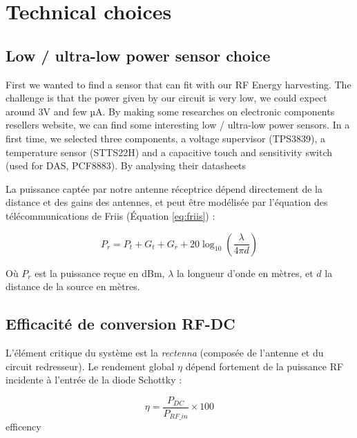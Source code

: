 \section{Technical choices}
\label{sec:task3}

\subsection{Low / ultra-low power sensor choice}
    First we wanted to find a sensor that can fit with our RF Energy harvesting. 
The challenge is that the power given by our circuit is very low, we could expect around 3V
and few µA. By making some researches on electronic components resellers website, we can find 
some interesting low / ultra-low power sensors. In a first time, we selected three components, a voltage supervisor (TPS3839), 
a temperature sensor (STTS22H) and a capacitive touch and sensitivity switch (used for DAS, PCF8883).
By analysing their datasheets   

La puissance captée par notre antenne réceptrice dépend directement de la distance et des gains des antennes, et peut être modélisée par l'équation des télécommunications de Friis (Équation \ref{eq:friis}) :

\begin{equation} \label{eq:friis}
    P_{r} = P_{t} + G_{t} + G_{r} + 20\log_{10}\left(\frac{\lambda}{4\pi d}\right)
\end{equation}

Où $P_r$ est la puissance reçue en dBm, $\lambda$ la longueur d'onde en mètres, et $d$ la distance de la source en mètres.

\subsection{Efficacité de conversion RF-DC}
L'élément critique du système est la \textit{rectenna} (composée de l'antenne et du circuit redresseur). Le rendement global $\eta$ dépend fortement de la puissance RF incidente à l'entrée de la diode Schottky :

\begin{equation} \label{eq:rendement}
    \eta = \frac{P_{DC}}{P_{RF\_in}} \times 100
\end{equation} efficency 